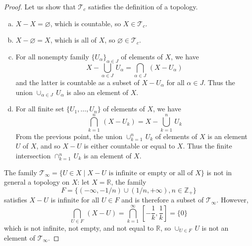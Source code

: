 \documentclass[11pt,a4paper,twoside]{article}
\theoremstyle{definition}
\theoremstyle{plain}
\begin{document}
\begin{proof}

  Let us show that $\mathscr{T}_c$ satisfies the definition of a topology.

  \begin{enumerate}[(a)]

  \item $X - X = \varnothing$, which is countable, so $X \in \mathscr{T}_c$.

  \item $X - \varnothing = X$, which is all of $X$, so $\varnothing \in \mathscr{T}_c$.

  \item For all nonempty family $\{ U_\alpha \}_{ \alpha \in J }$ of elements of $X$, we have
    \begin{equation*}
      X - \bigcup_{ \alpha \in J } \, U_\alpha = \bigcap_{ \alpha \in J } \, ( X - U_\alpha )
    \end{equation*}
    and the latter is countable as a subset of $X - U_\alpha$ for all $\alpha \in J$. Thus the
    union $\cup_{\alpha \in J} \, U_\alpha$ is also an element of $X$.

  \item For all finite set $\{ U_1, \dotsc , U_n \}$ of elements of $X$, we have
    \begin{equation*}
      \bigcap_{k = 1}^n \, ( X - U_k ) = X - \bigcup_{k = 1}^n \, U_k
    \end{equation*}
    From the previous point, the union $\cup_{k = 1}^n \, U_k$ of elements of $X$ is
    an element $U$ of $X$, and so $X - U$ is either countable or equal to $X$. Thus
    the finite intersection $\cap_{k = 1}^n \, U_k$ is an element of $X$.

  \end{enumerate}

  The family $\mathscr{T}_\infty = \{ U \in X \mid X - U \text{ is infinite or empty or all of } X \}$ is
  not in general a topology on $X$: let $X = \mathbb{R}$, the family
  \begin{equation*}
    F = \{ ( {- \infty}, - 1 / n ) \cup ( 1 / n, {+ \infty} ), n \in \mathbb{Z}_+ \}
  \end{equation*}
  satisfies $X - U$ is infinite for all $U \in F$ and is therefore a subset of $\mathscr{T}_\infty$.
  However,
  \begin{equation*}
    \bigcap_{U \in F} \, ( X - U ) = \bigcap_{k = 1}^\infty \, [ - \frac{1}{k}, \frac{1}{k} ] = \{ 0 \}
  \end{equation*}
  which is not infinite, not empty, and not equal to $\mathbb{R}$, so $\cup_{U \in F} \, U$ is not an
  element of $\mathscr{T}_\infty$.

\end{proof}
\end{document}

